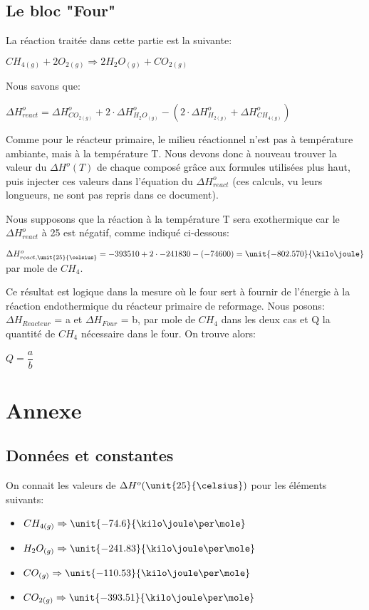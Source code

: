 \documentclass[11pt,a4paper]{report}
\begin{document}
\subsection*{Le bloc "Four"}
La réaction traitée dans cette partie est la suivante:

$CH_{4(g)} + 2O_{2(g)} \Rightarrow 2H_{2}O_{(g)} + CO_{2(g)}$

Nous savons que:

$\Delta H^o_{react} = \Delta H^o_{CO_{2(g)}} + 2\cdot \Delta H^o_{H_{2}O_{(g)}} - (2\cdot \Delta H^o_{H_{2(g)}} + \Delta H^o_{CH_{4(g)}}) $

Comme pour le réacteur primaire, le milieu réactionnel n'est pas à température ambiante, mais à la température T. Nous devons donc à nouveau trouver la valeur du $\Delta H^o(T)$ de chaque composé grâce aux formules utilisées plus haut, puis injecter ces valeurs dans l'équation du $\Delta H^o_{react}$ (ces calculs, vu leurs longueurs, ne sont pas repris dans ce document).

Nous supposons que la réaction à la température T sera exothermique car le $\Delta H^o_{react}$ à \unit{25}{\celsius} est négatif, comme indiqué ci-dessous:

$\Delta H^o_{react, \unit{25}{\celsius}} = -393510 + 2\cdot -241830 - (-74600) = \unit{-802.570}{\kilo\joule}$ par mole de $CH_4$.

Ce résultat est logique dans la mesure où le four sert à fournir de l'énergie à la réaction endothermique du réacteur primaire de reformage.
Nous posons:$\Delta H_{Reacteur}$  = a et $\Delta H_{Four}$  = b, par mole de $CH_4$ dans les deux cas et Q  la quantité de $CH_4$ nécessaire dans le four.
On trouve alors:

$Q = \dfrac{a}{b}$



\section*{Annexe}
\subsection*{Données et constantes}
On connait les valeurs de $\Delta H^o (\unit{25}{\celsius})$ pour les éléments suivants:
\begin{itemize}
\item{$CH_{4(g)} \Rightarrow \unit{-74.6}{\kilo\joule\per\mole}$}
\item{$H_2O_{(g)} \Rightarrow \unit{-241.83}{\kilo\joule\per\mole}$}
\item{$CO_{(g)} \Rightarrow \unit{-110.53}{\kilo\joule\per\mole}$}
\item{$CO_{2(g)} \Rightarrow \unit{-393.51}{\kilo\joule\per\mole}$}
\end{itemize}
\end{document}
